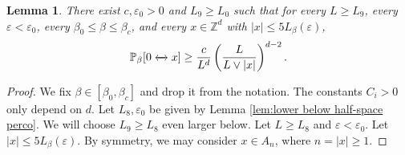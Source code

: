 \documentclass[11pt,a4paper]{article}
\numberwithin{equation}{section}
\theoremstyle{plain}
\newtheorem{Lem}[Thm]{Lemma}
\theoremstyle{definition}
\newcommand{\connect}{\xleftrightarrow}
\begin{document}
\begin{Lem}\label{lem:lower below full-space perco}  There exist $c,\varepsilon_0>0$ and $L_9\geq L_0$ such that for every $L\geq L_9$, every $\varepsilon<\varepsilon_0$, every $\beta_0\le \beta\le \beta_c$, and every $x\in \mathbb Z^d$ with $|x|\leq 5L_\beta(\varepsilon)$,
\begin{equation}\label{eq:lower bound small values full space perco}
\mathbb P_\beta[0\connect{}x]\ge \frac{c}{L^d}\left(\frac{L}{L\vee |x|}\right)^{d-2}.
\end{equation}
\end{Lem}
\begin{proof} We fix $\beta\in [\beta_0,\beta_c]$ and drop it from the notation. The constants $C_i>0$ only depend on $d$. Let $L_8, \varepsilon_0$ be given by Lemma \ref{lem:lower below half-space perco}. We will choose $L_9\geq L_8$ even larger below. Let $L\geq L_8$ and $\varepsilon<\varepsilon_0$. Let $|x|\leq 5L_\beta(\varepsilon)$. By symmetry, we may consider $x\in A_n$, where $n=|x|\geq 1$. 


\end{proof}
\end{document}
